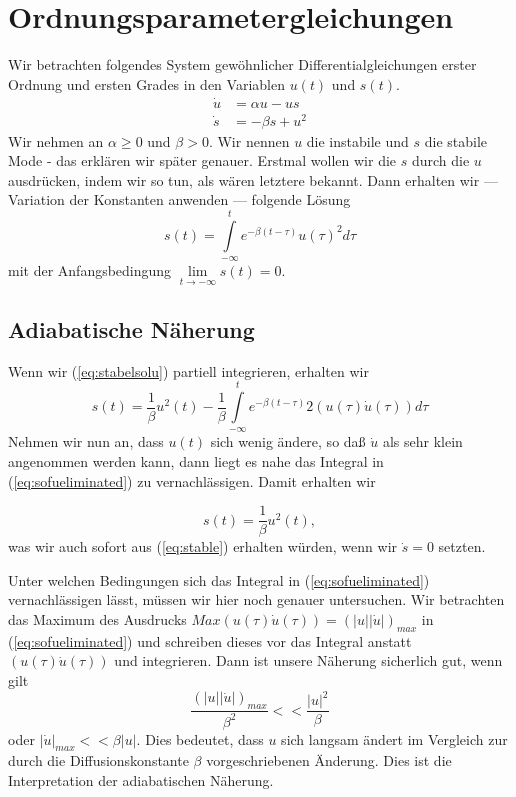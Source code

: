 \section{Ordnungsparametergleichungen}
Wir betrachten folgendes System gewöhnlicher Differentialgleichungen erster
Ordnung und ersten Grades in den Variablen $u(t)$ und $s(t)$.
\begin{align} 
  \dot{u}&=\alpha u-us
  \label{eq:unstable}\\
  \dot{s}&=-\beta s+u^2
  \label{eq:stable}
\end{align}
Wir nehmen an $\alpha\ge0$ und $\beta>0$. Wir nennen $u$ die instabile und $s$
die stabile Mode - das erklären wir später genauer. Erstmal wollen wir die $s$
durch die $u$ ausdrücken, indem wir so tun, als wären letztere bekannt. Dann
erhalten wir --- Variation der Konstanten anwenden --- folgende Lösung
\begin{equation}
  s(t)=\int\limits_{-\infty}^{t}e^{-\beta(t-\tau)}u(\tau)^2d\tau
  \label{eq:stabelsolu}
\end{equation}
mit der Anfangsbedingung $\lim\limits_{t\rightarrow -\infty}s(t)=0$.
\subsection{Adiabatische Näherung}
Wenn wir (\ref{eq:stabelsolu}) partiell integrieren, erhalten wir
\begin{equation}
  s(t)=\frac{1}{\beta}u^2(t)-\frac{1}{\beta}\int\limits_{-\infty}^{t}e^{-\beta(t-\tau)}
  2(u(\tau)\dot u(\tau))d\tau
  \label{eq:sofueliminated}
\end{equation}
Nehmen wir nun an, dass $u(t)$ sich wenig ändere, so daß $\dot u$ als sehr
klein angenommen werden kann, dann liegt es nahe das Integral in
(\ref{eq:sofueliminated}) zu vernachlässigen. Damit erhalten wir

\begin{equation}
  s(t)=\frac{1}{\beta}u^2(t),
  \label{eq:sapprox}
\end{equation}
was wir auch sofort aus (\ref{eq:stable}) erhalten würden, wenn wir $\dot s=0$
setzten.

Unter welchen Bedingungen sich das  Integral in (\ref{eq:sofueliminated})
vernachlässigen lässt, müssen wir hier noch genauer untersuchen. Wir betrachten
das Maximum des Ausdrucks $Max(u(\tau)\dot u(\tau))=(|u||\dot u|)_{max}$ in
(\ref{eq:sofueliminated}) und schreiben dieses vor das Integral anstatt
$(u(\tau)\dot u(\tau))$ und integrieren. Dann ist unsere Näherung sicherlich
gut, wenn gilt
\begin{equation}
\frac{(|u||\dot u|)_{max}}{\beta^2}<<\frac{|u|^2}{\beta}
  \label{eq:BedElim}
\end{equation}
oder $ |\dot u|_{max}<<\beta|u|$. Dies bedeutet, dass $u$ sich langsam ändert
im Vergleich zur durch die Diffusionskonstante $\beta$ vorgeschriebenen
Änderung. Dies ist die Interpretation der adiabatischen Näherung.
